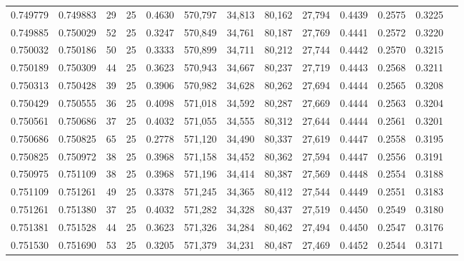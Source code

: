 \begin{tabular}{rrrrrrrrrrrrr}
0.749779 & 0.749883 &    29 &  25 &                                     0.4630 & 570,797 &  34,813 &  80,162 &  27,794 & 0.4439 & 0.2575 & 0.3225 \\
0.749885 & 0.750029 &    52 &  25 &                                     0.3247 & 570,849 &  34,761 &  80,187 &  27,769 & 0.4441 & 0.2572 & 0.3220 \\
0.750032 & 0.750186 &    50 &  25 &                                     0.3333 & 570,899 &  34,711 &  80,212 &  27,744 & 0.4442 & 0.2570 & 0.3215 \\
0.750189 & 0.750309 &    44 &  25 &                                     0.3623 & 570,943 &  34,667 &  80,237 &  27,719 & 0.4443 & 0.2568 & 0.3211 \\
0.750313 & 0.750428 &    39 &  25 &                                     0.3906 & 570,982 &  34,628 &  80,262 &  27,694 & 0.4444 & 0.2565 & 0.3208 \\
0.750429 & 0.750555 &    36 &  25 &                                     0.4098 & 571,018 &  34,592 &  80,287 &  27,669 & 0.4444 & 0.2563 & 0.3204 \\
0.750561 & 0.750686 &    37 &  25 &                                     0.4032 & 571,055 &  34,555 &  80,312 &  27,644 & 0.4444 & 0.2561 & 0.3201 \\
0.750686 & 0.750825 &    65 &  25 &                                     0.2778 & 571,120 &  34,490 &  80,337 &  27,619 & 0.4447 & 0.2558 & 0.3195 \\
0.750825 & 0.750972 &    38 &  25 &                                     0.3968 & 571,158 &  34,452 &  80,362 &  27,594 & 0.4447 & 0.2556 & 0.3191 \\
0.750975 & 0.751109 &    38 &  25 &                                     0.3968 & 571,196 &  34,414 &  80,387 &  27,569 & 0.4448 & 0.2554 & 0.3188 \\
0.751109 & 0.751261 &    49 &  25 &                                     0.3378 & 571,245 &  34,365 &  80,412 &  27,544 & 0.4449 & 0.2551 & 0.3183 \\
0.751261 & 0.751380 &    37 &  25 &                                     0.4032 & 571,282 &  34,328 &  80,437 &  27,519 & 0.4450 & 0.2549 & 0.3180 \\
0.751381 & 0.751528 &    44 &  25 &                                     0.3623 & 571,326 &  34,284 &  80,462 &  27,494 & 0.4450 & 0.2547 & 0.3176 \\
0.751530 & 0.751690 &    53 &  25 &                                     0.3205 & 571,379 &  34,231 &  80,487 &  27,469 & 0.4452 & 0.2544 & 0.3171 \\

\end{tabular}
